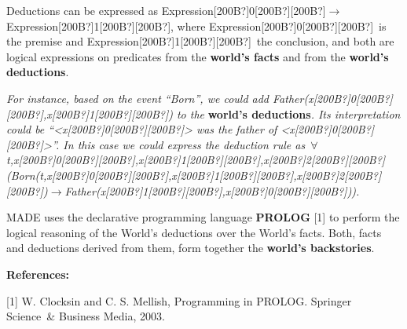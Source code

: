 \documentclass[a4paper]{article}
\newcommand\textstyleStrongEmphasis[1]{\textbf{#1}}
\newcommand\textstyleEmphasis[1]{\textit{#1}}
\begin{document}
Deductions can be expressed as
Expression[200B?]0[200B?][200B?]$\rightarrow
$Expression[200B?]1[200B?][200B?], where
Expression[200B?]0[200B?][200B?]~is the premise and
Expression[200B?]1[200B?][200B?]~the conclusion, and both are logical
expressions on predicates from the
\textstyleStrongEmphasis{world{\textquoteright}s facts} and from the
\textstyleStrongEmphasis{world{\textquoteright}s deductions}.

\textstyleEmphasis{For instance, based on the event
{\textquotedblleft}Born{\textquotedblright}, we could add
Father(x[200B?]0[200B?][200B?],x[200B?]1[200B?][200B?]) to the
}\textstyleStrongEmphasis{world{\textquoteright}s
deductions}\textstyleEmphasis{. Its interpretation could be
{\textquotedblleft}{\textless}x[200B?]0[200B?][200B?]{\textgreater} was
the father of
{\textless}x[200B?]0[200B?][200B?]{\textgreater}{\textquotedblright}.
In this case we could express the deduction rule
as~${\forall}$t,x[200B?]0[200B?][200B?],x[200B?]1[200B?][200B?],x[200B?]2[200B?][200B?](Born(t,x[200B?]0[200B?][200B?],x[200B?]1[200B?][200B?],x[200B?]2[200B?][200B?])$\rightarrow
$Father(x[200B?]1[200B?][200B?],x[200B?]0[200B?][200B?])).}

MADE uses the declarative programming language
\textstyleStrongEmphasis{PROLOG} [1] to perform the logical reasoning
of the World{\textquoteright}s deductions over the
World{\textquoteright}s facts. Both, facts and deductions derived from
them, form together the
\textstyleStrongEmphasis{world{\textquoteright}s backstories}.

{\bfseries
References:}

[1] W. Clocksin and C. S. Mellish, Programming in PROLOG. Springer
Science~\& Business Media, 2003.
\end{document}
